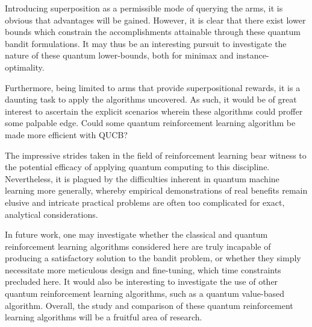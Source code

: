 Introducing superposition as a permissible mode of querying the arms, it is obvious that advantages will be gained.
However, it is clear that there exist lower bounds which constrain the accomplishments attainable through these quantum bandit formulations.
It may thus be an interesting pursuit to investigate the nature of these quantum lower-bounds, both for minimax and instance-optimality.

Furthermore, being limited to arms that provide superpositional rewards, it is a daunting task to apply the algorithms uncovered.
As such, it would be of great interest to ascertain the explicit scenarios wherein these algorithms could proffer some palpable edge.
Could some quantum reinforcement learning algorithm be made more efficient with QUCB?

The impressive strides taken in the field of reinforcement learning bear witness to the potential efficacy of applying quantum computing to this discipline.
Nevertheless, it is plagued by the difficulties inherent in quantum machine learning more generally, whereby empirical demonstrations of real benefits remain elusive and intricate practical problems are often too complicated for exact, analytical considerations.

In future work, one may investigate whether the classical and quantum reinforcement learning algorithms considered here are truly incapable of producing a satisfactory solution to the bandit problem, or whether they simply necessitate more meticulous design and fine-tuning, which time constraints precluded here.
It would also be interesting to investigate the use of other quantum reinforcement learning algorithms, such as a quantum value-based algorithm.
Overall, the study and comparison of these quantum reinforcement learning algorithms will be a fruitful area of research.
